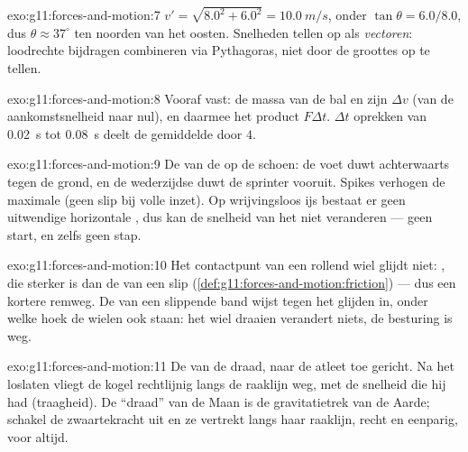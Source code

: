 \begin{solution}{exo:g11:forces-and-motion:7}
$v' = \sqrt{8.0^2 + 6.0^2} = \qty{10.0}{m/s}$, onder
$\tan\theta = 6.0/8.0$, dus $\theta \approx 37^\circ$ ten noorden van het
oosten. Snelheden tellen op als \emph{vectoren}: loodrechte bijdragen
combineren via Pythagoras, niet door de groottes op te tellen.
\end{solution}

\begin{solution}{exo:g11:forces-and-motion:8}
Vooraf vast: de massa van de bal en zijn $\Delta v$ (van de
aankomstsnelheid naar nul), en daarmee het product $F\Delta t$.
$\Delta t$ oprekken van \qty{0.02}{s} tot \qty{0.08}{s} deelt de
gemiddelde  door $4$.
\end{solution}

\begin{solution}{exo:g11:forces-and-motion:9}
De  van de  op de schoen: de voet duwt achterwaarts
tegen de grond, en de wederzijdse  duwt de sprinter vooruit.
Spikes verhogen de maximale  (geen slip bij volle
inzet). Op wrijvingsloos ijs bestaat er geen uitwendige horizontale
, dus kan de snelheid van het  niet veranderen ---
geen start, en zelfs geen stap.
\end{solution}

\begin{solution}{exo:g11:forces-and-motion:10}
Het contactpunt van een rollend wiel glijdt niet: , die
sterker is dan de  van een slip
(\cref{def:g11:forces-and-motion:friction}) --- dus een kortere remweg.
De  van een slippende band wijst tegen het glijden in,
onder welke hoek de wielen ook staan: het wiel draaien verandert niets,
de besturing is weg.
\end{solution}

\begin{solution}{exo:g11:forces-and-motion:11}
De  van de draad, naar de atleet toe gericht. Na het loslaten
vliegt de kogel rechtlijnig langs de raaklijn weg, met de snelheid die
hij had (traagheid). De ``draad'' van de Maan is de gravitatietrek van de
Aarde; schakel de zwaartekracht uit en ze vertrekt langs haar raaklijn,
recht en eenparig, voor altijd.
\end{solution}

